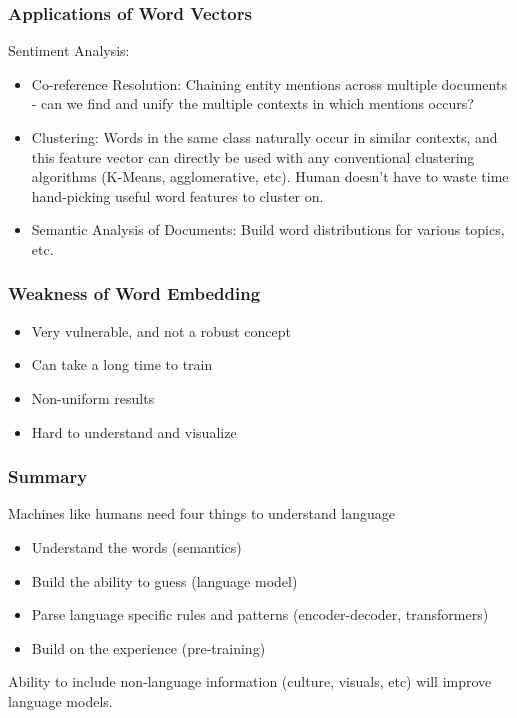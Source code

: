 \begin{frame}[fragile]\frametitle{Applications of Word Vectors}
Sentiment Analysis:
\begin{itemize}
\item Co-reference Resolution: Chaining entity mentions across multiple documents  - can we find and unify the multiple contexts in which mentions occurs?
\item Clustering: Words in the same class naturally occur in similar contexts,  and this feature vector can directly be used with any conventional clustering algorithms (K-Means, agglomerative, etc). Human doesn't have to waste time hand-picking useful word features to cluster on.
\item Semantic Analysis of Documents: Build word distributions for various topics, etc.

\end{itemize}
\end{frame}

\begin{frame}[fragile]\frametitle{Weakness of Word Embedding}
\begin{itemize}
\item Very vulnerable, and not a robust concept
\item Can take a long time to train
\item Non-uniform results
\item Hard to understand and visualize
\end{itemize}
\end{frame}

\begin{frame}[fragile]\frametitle{Summary}
Machines like humans need four things to understand language

\begin{itemize}
\item Understand the words (semantics)
\item Build the ability to guess (language model)
\item Parse language specific rules and patterns (encoder-decoder, transformers)
\item Build on the experience (pre-training)
\end{itemize}

Ability to include non-language information (culture, visuals, etc) will improve language models.

\end{frame}